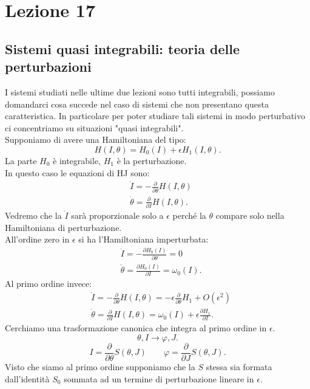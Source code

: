 \section{Lezione 17}%
\label{sub:Lezione 17}
\subsection{Sistemi quasi integrabili: teoria delle perturbazioni}%
\label{sub:Sistemi quasi integrabili: teoria delle perturbazioni}
I sistemi studiati nelle ultime due lezioni sono tutti integrabili, possiamo domandarci cosa succede nel caso di sistemi che non presentano questa caratteristica. In particolare per poter studiare tali sistemi in modo perturbativo ci concentriamo su situazioni "quasi integrabili".\\
Supponiamo di avere una Hamiltoniana del tipo:
\[
    H(I, \theta) = H_0(I) + \epsilon H_1(I, \theta  ) 
.\] 
La parte $H_0$ è integrabile, $H_1$ è la perturbazione.\\
In questo caso le equazioni di HJ sono:
\[\begin{aligned}
     & \dot{I} = - \frac{\partial }{\partial \theta  } H(I,\theta  ) \\
     & \dot{\theta} = \frac{\partial}{\partial I} H(I, \theta  ) 
.\end{aligned}\]
Vedremo che la $\dot{I}$  sarà proporzionale solo a $\epsilon$  perché la $\theta  $  compare solo nella Hamiltoniana di perturbazione.\\
All'ordine zero in $\epsilon$ si ha l'Hamiltoniana imperturbata:
\[\begin{aligned}
    & \dot{I} = - \frac{\partial H_0(I)}{\partial \theta  } = 0\\
    & \dot{\theta  }=\frac{\partial H_0(I) }{\partial I} = \omega_0(I) 
.\end{aligned}\]
Al primo ordine invece:
\[\begin{aligned}
    & \dot{I} = - \frac{\partial }{\partial \theta} H(I, \theta)= -\epsilon\frac{\partial }{\partial \theta  } H_1 + O(\epsilon^2) \\ 
    & \dot{\theta  }=\frac{\partial  }{\partial I} H(I, \theta) = \omega_0(I) + \epsilon  \frac{\partial H_1}{\partial I} 
.\end{aligned}\]
Cerchiamo una trasformazione canonica che integra al primo ordine in $\epsilon$.
\[
    \theta, I \to \varphi, J
.\] 
\[
    I = \frac{\partial }{\partial \theta  } S(\theta, J)  \qquad \varphi = \frac{\partial }{\partial J} S(\theta, J) 
.\] 
Visto che siamo al primo ordine supponiamo che la $S$  stessa sia formata dall'identità $S_0$  sommata ad un termine di perturbazione lineare in $\epsilon$.\\
